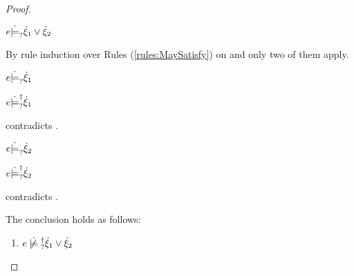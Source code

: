 \begin{proof}
\begin{byCases}
\begin{byCases}
  \end{byCases}

\item[\text{(\ref{rule:CSMSMay})}]
  \begin{pfsteps*}
  \item $e \dot{\models}_{?} \dot{\xi}_1 \vee \dot{\xi}_2$  
  \end{pfsteps*}
  By rule induction over Rules (\ref{rules:MaySatisfy}) on  and only two of them apply.
  \begin{byCases}

  \item[\text{(\ref{rule:CMSOr1})}]
    \begin{pfsteps*}
    \item $e \dot{\models}_{?} \dot{\xi}_1$  
    \item $e \dot{\models}_{?}^{\dag} \dot{\xi}_1$  
    \end{pfsteps*}
     contradicts .

  \item[\text{(\ref{rule:CMSOr2})}]
    \begin{pfsteps*}
    \item $e \dot{\models}_{?} \dot{\xi}_2$  
    \item $e \dot{\models}_{?}^{\dag} \dot{\xi}_2$  
    \end{pfsteps*}
     contradicts .

  \end{byCases}
\end{byCases}
The conclusion holds as follows:
\begin{enumerate}
  \item $\cnotsatisfyormay{e}{\cor{\hxi_1}{\hxi_2}}$
\end{enumerate}
\resetpfcounter
\end{proof}

